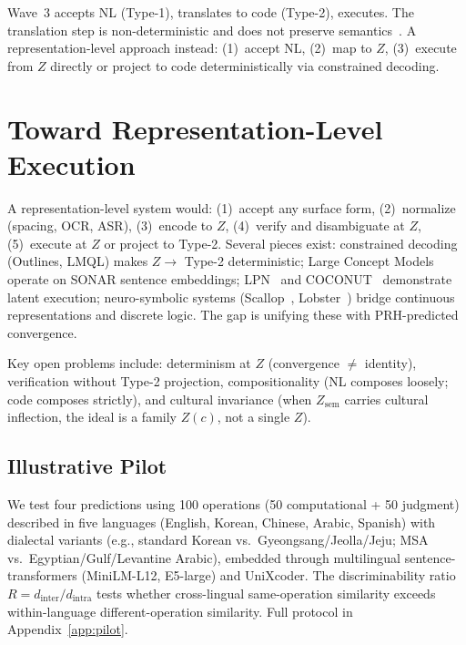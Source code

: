 \documentclass[11pt]{article}
\theoremstyle{definition}
\newcommand{\Zsem}{Z_{\text{sem}}}
\begin{document}
Wave~3 accepts NL (Type-1), translates to code (Type-2), executes. The translation step is non-deterministic and does not preserve semantics~\cite{cheung2025translation}. A representation-level approach instead: (1)~accept NL, (2)~map to $Z$, (3)~execute from $Z$ directly or project to code deterministically via constrained decoding.


\section{Toward Representation-Level Execution}\label{sec:toward}

A representation-level system would: (1)~accept any surface form, (2)~normalize (spacing, OCR, ASR), (3)~encode to $Z$, (4)~verify and disambiguate at $Z$, (5)~execute at $Z$ or project to Type-2. Several pieces exist: constrained decoding (Outlines, LMQL) makes $Z \to$ Type-2 deterministic; Large Concept Models~\cite{meta2024lcm} operate on SONAR sentence embeddings; LPN~\cite{macfarlane2025lpn} and COCONUT~\cite{hao2024coconut} demonstrate latent execution; neuro-symbolic systems (Scallop~\cite{li2023scallop}, Lobster~\cite{huang2026lobster}) bridge continuous representations and discrete logic. The gap is unifying these with PRH-predicted convergence.

Key open problems include: determinism at $Z$ (convergence $\neq$ identity), verification without Type-2 projection, compositionality (NL composes loosely; code composes strictly), and cultural invariance (when $\Zsem$ carries cultural inflection, the ideal is a family $Z(c)$, not a single $Z$).

\subsection{Illustrative Pilot}\label{sec:pilot}

We test four predictions using 100 operations (50 computational + 50 judgment) described in five languages (English, Korean, Chinese, Arabic, Spanish) with dialectal variants (e.g., standard Korean vs.\ Gyeongsang/Jeolla/Jeju; MSA vs.\ Egyptian/Gulf/Levantine Arabic), embedded through multilingual sentence-transformers (MiniLM-L12, E5-large) and UniXcoder. The discriminability ratio $R = d_{\text{inter}}/d_{\text{intra}}$ tests whether cross-lingual same-operation similarity exceeds within-language different-operation similarity. Full protocol in Appendix~\ref{app:pilot}.
\end{document}
